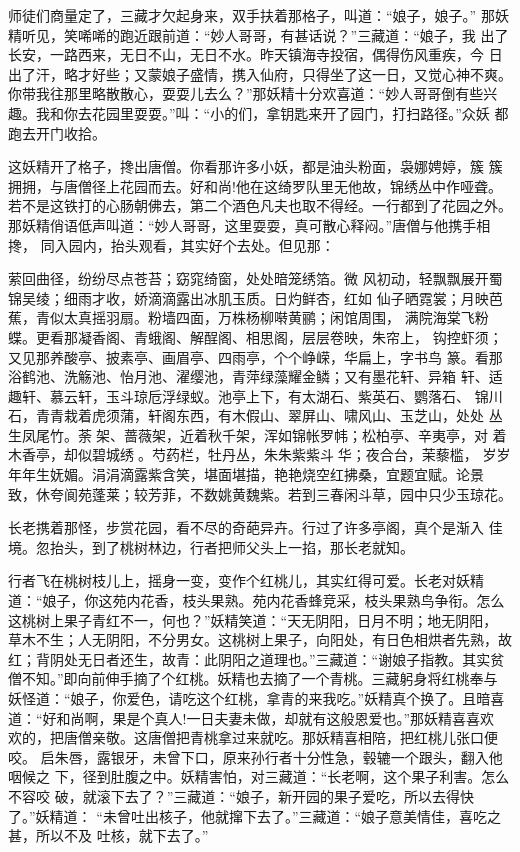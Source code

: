 师徒们商量定了，三藏才欠起身来，双手扶着那格子，叫道：“娘子，娘子。”
那妖精听见，笑唏唏的跑近跟前道：“妙人哥哥，有甚话说？”三藏道：“娘子，我
出了长安，一路西来，无日不山，无日不水。昨天镇海寺投宿，偶得伤风重疾，今
日出了汗，略才好些；又蒙娘子盛情，携入仙府，只得坐了这一日，又觉心神不爽。
你带我往那里略散散心，耍耍儿去么？”那妖精十分欢喜道：“妙人哥哥倒有些兴
趣。我和你去花园里耍耍。”叫：“小的们，拿钥匙来开了园门，打扫路径。”众妖
都跑去开门收拾。

这妖精开了格子，搀出唐僧。你看那许多小妖，都是油头粉面，袅娜娉婷，簇
簇拥拥，与唐僧径上花园而去。好和尚!他在这绮罗队里无他故，锦绣丛中作哑聋。
若不是这铁打的心肠朝佛去，第二个酒色凡夫也取不得经。一行都到了花园之外。
那妖精俏语低声叫道：“妙人哥哥，这里耍耍，真可散心释闷。”唐僧与他携手相搀，
同入园内，抬头观看，其实好个去处。但见那：

萦回曲径，纷纷尽点苍苔；窈窕绮窗，处处暗笼绣箔。微
风初动，轻飘飘展开蜀锦吴绫；细雨才收，娇滴滴露出冰肌玉质。日灼鲜杏，红如
仙子晒霓裳；月映芭蕉，青似太真摇羽扇。粉墙四面，万株杨柳啭黄鹂；闲馆周围，
满院海棠飞粉蝶。更看那凝香阁、青蛾阁、解酲阁、相思阁，层层卷映，朱帘上，
钩控虾须；又见那养酸亭、披素亭、画眉亭、四雨亭，个个峥嵘，华扁上，字书鸟
篆。看那浴鹤池、洗觞池、怡月池、濯缨池，青萍绿藻耀金鳞；又有墨花轩、异箱
轩、适趣轩、慕云轩，玉斗琼卮浮绿蚁。池亭上下，有太湖石、紫英石、鹦落石、
锦川石，青青栽着虎须蒲，轩阁东西，有木假山、翠屏山、啸风山、玉芝山，处处
丛生凤尾竹。荼架、蔷薇架，近着秋千架，浑如锦帐罗帏；松柏亭、辛夷亭，对
着木香亭，却似碧城绣。芍药栏，牡丹丛，朱朱紫紫斗华；夜合台，茉藜槛，
岁岁年年生妩媚。涓涓滴露紫含笑，堪面堪描，艳艳烧空红拂桑，宜题宜赋。论景
致，休夸阆苑蓬莱；较芳菲，不数姚黄魏紫。若到三春闲斗草，园中只少玉琼花。

长老携着那怪，步赏花园，看不尽的奇葩异卉。行过了许多亭阁，真个是渐入
佳境。忽抬头，到了桃树林边，行者把师父头上一掐，那长老就知。

行者飞在桃树枝儿上，摇身一变，变作个红桃儿，其实红得可爱。长老对妖精
道：“娘子，你这苑内花香，枝头果熟。苑内花香蜂竞采，枝头果熟鸟争衔。怎么
这桃树上果子青红不一，何也？”妖精笑道：“天无阴阳，日月不明；地无阴阳，
草木不生；人无阴阳，不分男女。这桃树上果子，向阳处，有日色相烘者先熟，故
红；背阴处无日者还生，故青：此阴阳之道理也。”三藏道：“谢娘子指教。其实贫
僧不知。”即向前伸手摘了个红桃。妖精也去摘了一个青桃。三藏躬身将红桃奉与
妖怪道：“娘子，你爱色，请吃这个红桃，拿青的来我吃。”妖精真个换了。且暗喜
道：“好和尚啊，果是个真人!一日夫妻未做，却就有这般恩爱也。”那妖精喜喜欢
欢的，把唐僧亲敬。这唐僧把青桃拿过来就吃。那妖精喜相陪，把红桃儿张口便咬。
启朱唇，露银牙，未曾下口，原来孙行者十分性急，毂辘一个跟头，翻入他咽候之
下，径到肚腹之中。妖精害怕，对三藏道：“长老啊，这个果子利害。怎么不容咬
破，就滚下去了？”三藏道：“娘子，新开园的果子爱吃，所以去得快了。”妖精道：
“未曾吐出核子，他就撺下去了。”三藏道：“娘子意美情佳，喜吃之甚，所以不及
吐核，就下去了。”


